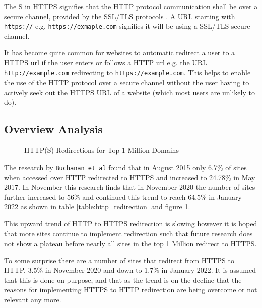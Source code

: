 \documentclass{mscreport}
\begin{document}
\noindent
The S in HTTPS signifies that the HTTP protocol communication shall be over a secure channel, provided by the SSL/TLS protocols \cite{Rescorla2000-fs}. A URL starting with \texttt{https://} e.g. \texttt{https://exmaple.com} signifies it will be using a SSL/TLS secure channel.

\vspace{0.3cm} \noindent
It has become quite common for websites to automatic redirect a user to a HTTPS url if the user enters or follows a HTTP url e.g. the URL \texttt{http://example.com} redirecting to \texttt{https://example.com}. This helps to enable the use of the HTTP protocol over a secure channel without the user having to actively seek out the HTTPS URL of a website (which most users are unlikely to do).

\subsection{Overview Analysis}

\begin{figure}[H]
	\begin{center}
		\caption{HTTP(S) Redirections for Top 1 Million Domains}
		\label{fig:http_redirection}
	\end{center}
\end{figure}


\noindent
The research by \texttt{Buchanan et al} \cite{Buchanan2018-xz} found that in August 2015 only 6.7\% of sites when accessed over HTTP redirected to HTTPS and increased to 24.78\% in May 2017. In November this research finds that in November 2020 the number of sites further increased to 56\% and continued this trend to reach 64.5\% in January 2022 as shown in table \ref{table:http_redirection} and figure \ref{fig:http_redirection}.

\newpage

\vspace{0.3cm} \noindent
This upward trend of HTTP to HTTPS redirection is slowing however it is hoped that more sites continue to implement redirection such that future research does not show a plateau before nearly all sites in the top 1 Million redirect to HTTPS.

\vspace{0.3cm} \noindent
To some surprise there are a number of sites that redirect from HTTPS to HTTP, 3.5\% in November 2020 and  down to 1.7\% in January 2022. It is assumed that this is done on purpose, and that as the trend is on the decline that the reasons for implementing HTTPS to HTTP redirection are being overcome or not relevant any more.
\end{document}
